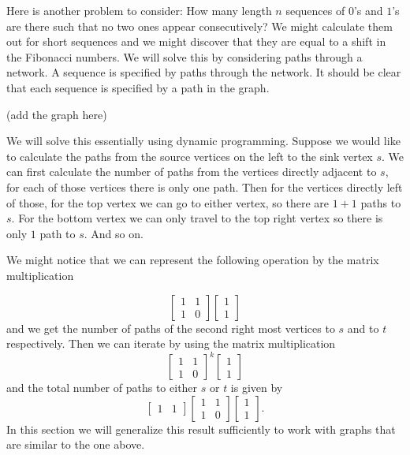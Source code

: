 Here is another problem to consider: How many length $n$ sequences of $0$'s and $1$'s are there such that no two ones appear consecutively? We might calculate them out for short sequences and we might discover that they are equal to a shift in the Fibonacci numbers. We will solve this by considering paths through a network. A sequence is specified by paths through the network. It should be clear that each sequence is specified by a path in the graph.

(add the graph here)

We will solve this essentially using dynamic programming. Suppose we would like to calculate the paths from the source vertices on the left to the sink vertex $s$. We can first calculate the number of paths from the vertices directly adjacent to $s$, for each of those vertices there is only one path. Then for the vertices directly left of those, for the top vertex we can go to either vertex, so there are $1 + 1$ paths to $s$. For the bottom vertex we can only travel to the top right vertex so there is only $1$ path to $s$. And so on.

We might notice that we can represent the following operation by the matrix multiplication

\[\begin{bmatrix} 1 & 1 \\ 1 & 0\end{bmatrix}\begin{bmatrix} 1 \\ 1\end{bmatrix}\] and we get the number of paths of the second right most vertices to $s$ and to $t$ respectively. Then we can iterate by using the matrix multiplication
\[\begin{bmatrix} 1 & 1 \\ 1 & 0\end{bmatrix}^k\begin{bmatrix} 1 \\ 1\end{bmatrix}\] and the total number of paths to either $s$ or $t$ is given by
\[\begin{bmatrix}1 & 1 \end{bmatrix}\begin{bmatrix} 1 & 1 \\ 1 & 0\end{bmatrix}\begin{bmatrix} 1 \\ 1\end{bmatrix}.\]
In this section we will generalize this result sufficiently to work with graphs that are similar to the one above.

